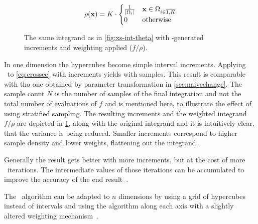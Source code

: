 \begin{equation}
  \label{eq:vegasrho}
  \rho(\vb{x}) = K\cdot
  \begin{cases}
    \frac{1}{\abs{\Omega_i}} & \vb{x}\in\Omega_{i\in\overline{1,K}} \\
    0 & \text{otherwise}
  \end{cases}
\end{equation}

\begin{figure}[ht]
  \centering {}
  \caption[\(2\pi\dv{\sigma}{\theta}\) scaled to increments found by
  \vegas\ ]{\label{fig:xs-int-vegas} The same integrand as
    in \cref{fig:xs-int-theta} with \vegas-generated increments and
    weighting applied (\(f/\rho\)).}
\end{figure}

In one dimension the hypercubes become simple interval
increments. Applying \vegas\ to \cref{eq:crossec} with
 increments yields
 with
 samples. This result is comparable
with tho one obtained by parameter transformation
in \cref{sec:naivechange}.  The sample count \(N\) is the number of
samples of the final integration and not the total number of
evaluations of \(f\) and is mentioned here, to illustrate the effect
of using stratified sampling. The resulting increments and the
weighted integrand \(f/\rho\) are depicted in \cref{fig:xs-int-vegas},
along with the original integrand and it is intuitively clear, that
the variance is being reduced. Smaller increments correspond to higher
sample density and lower weights, flattening out the integrand.

Generally the result gets better with more increments, but at the cost
of more \vegas\ iterations. The intermediate values of those
iterations can be accumulated to improve the accuracy of the end
result~\cite[197]{Lepage:19781an}.

The \vegas\ algorithm can be adapted to \(n\) dimensions by using a
grid of hypercubes instead of intervals and using the algorithm along
each axis with a slightly altered weighting
mechanism~\cite[197]{Lepage:19781an}.

